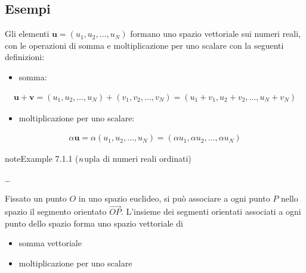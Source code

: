\documentclass[letterpaper,10pt,italian]{jupyterBook}
\begin{document}
\subsection{Esempi}
\label{\detokenize{ch/algebra/vector-algebra-def:esempi}}\label{\detokenize{ch/algebra/vector-algebra-def:math-hs-algebra-vector-def-examples}}
\sphinxAtStartPar
{} Gli elementi \(\mathbf{u} = (u_1, u_2, \dots, u_N)\) formano uno spazio vettoriale sui numeri reali, con le operazioni di somma e moltiplicazione per uno scalare con la seguenti definizioni:
\begin{itemize}
\item {} 
\sphinxAtStartPar
somma:

\end{itemize}
\begin{equation}\label{equation:ch/algebra/vector-algebra-def:eq:vector:operations:nuples:sum}
\begin{split}
  \mathbf{u} + \mathbf{v} = (u_1, u_2, \dots, u_N) + (v_1, v_2, \dots, v_N) = (u_1+v_1, u_2+v_2, \dots, u_N+v_N)
\end{split}
\end{equation}\begin{itemize}
\item {} 
\sphinxAtStartPar
moltiplicazione per uno scalare:

\end{itemize}
\begin{equation}\label{equation:ch/algebra/vector-algebra-def:eq:vector:operations:nuples:mult}
\begin{split}
  \alpha \mathbf{u}       = \alpha (u_1, u_2, \dots, u_N)                   = (\alpha u_1, \alpha u_2, \dots, \alpha u_N)
\end{split}
\end{equation}\label{ch/algebra/vector-algebra-def:ex-vectors-nuple}
\begin{sphinxadmonition}{note}{Example 7.1.1 (\protect\(n\protect\)\sphinxhyphen{}upla di numeri reali ordinati)}



\sphinxAtStartPar
…
\end{sphinxadmonition}

\sphinxAtStartPar
{}
Fissato un punto \(O\) in uno spazio euclideo, si può associare a ogni punto \(P\) nello spazio il segmento orientato \(\overrightarrow{OP}\). L’insieme dei segmenti orientati associati a ogni punto dello spazio forma uno spazio vettoriale di
\begin{itemize}
\item {} 
\sphinxAtStartPar
somma vettoriale

\item {} 
\sphinxAtStartPar
moltiplicazione per uno scalare

\end{itemize}
\end{document}
